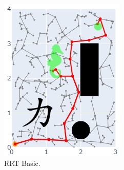 		
		\begin{figure}[H]
			\centering
			\begin{minipage}[b]{0.4\textwidth}
				\includegraphics[width=\textwidth]{links/rectangle_basic.png}
				\caption{RRT Basic.}
			\end{minipage}
			\hfill
			\begin{minipage}[b]{0.4\textwidth}

\end{minipage}
\end{figure}
